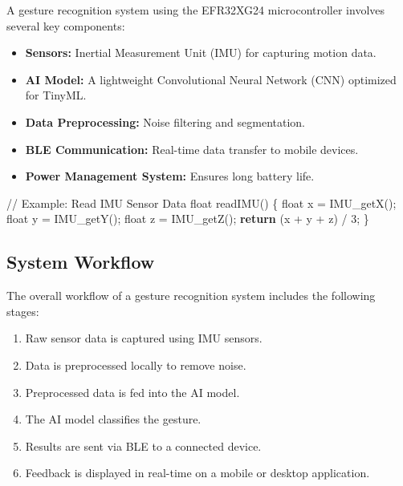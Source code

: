 \documentclass[
  9pt,
  letterpaper,
  abstract,
  titlepage]{scrbook}
\newenvironment{Shaded}{\begin{snugshade}}{\end{snugshade}}
\newcommand{\CommentTok}[1]{\textcolor[rgb]{0.37,0.37,0.37}{#1}}
\newcommand{\ControlFlowTok}[1]{\textcolor[rgb]{0.00,0.23,0.31}{\textbf{#1}}}
\newcommand{\DataTypeTok}[1]{\textcolor[rgb]{0.68,0.00,0.00}{#1}}
\newcommand{\DecValTok}[1]{\textcolor[rgb]{0.68,0.00,0.00}{#1}}
\newcommand{\NormalTok}[1]{\textcolor[rgb]{0.00,0.23,0.31}{#1}}
\newcommand{\OperatorTok}[1]{\textcolor[rgb]{0.37,0.37,0.37}{#1}}
\begin{document}
A gesture recognition system using the EFR32XG24 microcontroller
involves several key components:

\begin{itemize}
\item
  \textbf{Sensors:} Inertial Measurement Unit (IMU) for capturing motion
  data.
\item
  \textbf{AI Model:} A lightweight Convolutional Neural Network (CNN)
  optimized for TinyML.
\item
  \textbf{Data Preprocessing:} Noise filtering and segmentation.
\item
  \textbf{BLE Communication:} Real-time data transfer to mobile devices.
\item
  \textbf{Power Management System:} Ensures long battery life.
\end{itemize}

\begin{Shaded}
\begin{Highlighting}[]
\CommentTok{// Example: Read IMU Sensor Data}
\DataTypeTok{float}\NormalTok{ readIMU}\OperatorTok{()} \OperatorTok{\{}
    \DataTypeTok{float}\NormalTok{ x }\OperatorTok{=}\NormalTok{ IMU\_getX}\OperatorTok{();}
    \DataTypeTok{float}\NormalTok{ y }\OperatorTok{=}\NormalTok{ IMU\_getY}\OperatorTok{();}
    \DataTypeTok{float}\NormalTok{ z }\OperatorTok{=}\NormalTok{ IMU\_getZ}\OperatorTok{();}
    \ControlFlowTok{return} \OperatorTok{(}\NormalTok{x }\OperatorTok{+}\NormalTok{ y }\OperatorTok{+}\NormalTok{ z}\OperatorTok{)} \OperatorTok{/} \DecValTok{3}\OperatorTok{;}
\OperatorTok{\}}
\end{Highlighting}
\end{Shaded}

\subsection{System Workflow}\label{system-workflow}

The overall workflow of a gesture recognition system includes the
following stages:

\begin{enumerate}
\def\labelenumi{\arabic{enumi}.}
\item
  Raw sensor data is captured using IMU sensors.
\item
  Data is preprocessed locally to remove noise.
\item
  Preprocessed data is fed into the AI model.
\item
  The AI model classifies the gesture.
\item
  Results are sent via BLE to a connected device.
\item
  Feedback is displayed in real-time on a mobile or desktop application.
\end{enumerate}
\end{document}

